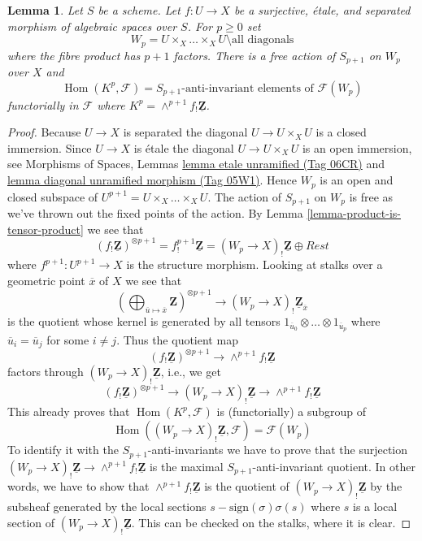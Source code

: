 \documentclass{amsart}
\theoremstyle{plain}
\newtheorem{lemma}[subsection]{Lemma}
\theoremstyle{definition}
\theoremstyle{remark}
\numberwithin{equation}{subsection}
\def\Hom{\mathop{\mathrm{Hom}}\nolimits}
\begin{document}
\begin{lemma}
\label{lemma-compute}
Let $S$ be a scheme. Let $f : U \to X$ be a surjective, \'etale, and separated
morphism of algebraic spaces over $S$. For $p \geq 0$ set
$$
W_p = U \times_X \ldots \times_X U \setminus \text{all diagonals}
$$
where the fibre product has $p + 1$ factors.
There is a free action of $S_{p + 1}$ on $W_p$ over $X$ and
$$
\Hom(K^p, \mathcal{F}) = S_{p + 1}\text{-anti-invariant elements of }
\mathcal{F}(W_p)
$$
functorially in $\mathcal{F}$ where
$K^p = \wedge^{p + 1}f_!\underline{\mathbf{Z}}$.
\end{lemma}

\begin{proof}
Because $U \to X$ is separated the diagonal $U \to U \times_X U$ is a
closed immersion. Since $U \to X$ is \'etale the diagonal
$U \to U \times_X U$ is an open immersion, see
Morphisms of Spaces, Lemmas
\href{https://stacks.math.columbia.edu/tag/06CR}{lemma etale unramified (Tag 06CR)} and
\href{https://stacks.math.columbia.edu/tag/05W1}{lemma diagonal unramified morphism (Tag 05W1)}.
Hence $W_p$ is an open and closed subspace of
$U^{p + 1} = U \times_X \ldots \times_X U$. The action of $S_{p + 1}$
on $W_p$ is free as we've thrown out the fixed points of the action.
By
Lemma \ref{lemma-product-is-tensor-product}
we see that
$$
(f_!\underline{\mathbf{Z}})^{\otimes p + 1} =
f^{p + 1}_!\underline{\mathbf{Z}} = (W_p \to X)_!\underline{\mathbf{Z}}
\oplus Rest
$$
where $f^{p + 1} : U^{p + 1} \to X$ is the structure morphism.
Looking at stalks over a geometric point $\overline{x}$ of $X$
we see that
$$
\left(
\bigoplus\nolimits_{\overline{u} \mapsto \overline{x}} \mathbf{Z}
\right)^{\otimes p + 1}
\longrightarrow
(W_p \to X)_!\underline{\mathbf{Z}}_{\overline{x}}
$$
is the quotient whose kernel is generated by all tensors
$1_{\overline{u}_0} \otimes \ldots \otimes 1_{\overline{u}_p}$
where $\overline{u}_i = \overline{u}_j$ for some $i \not = j$.
Thus the quotient map
$$
(f_!\underline{\mathbf{Z}})^{\otimes p + 1}
\longrightarrow
\wedge^{p + 1}f_!\underline{\mathbf{Z}}
$$
factors through $(W_p \to X)_!\underline{\mathbf{Z}}$, i.e., we get
$$
(f_!\underline{\mathbf{Z}})^{\otimes p + 1}
\longrightarrow
(W_p \to X)_!\underline{\mathbf{Z}}
\longrightarrow
\wedge^{p + 1}f_!\underline{\mathbf{Z}}
$$
This already proves that $\Hom(K^p, \mathcal{F})$ is (functorially) a
subgroup of
$$
\Hom((W_p \to X)_!\underline{\mathbf{Z}}, \mathcal{F}) = \mathcal{F}(W_p)
$$
To identify it with the $S_{p + 1}$-anti-invariants we have to prove that
the surjection $(W_p \to X)_!\underline{\mathbf{Z}}
\to \wedge^{p + 1}f_!\underline{\mathbf{Z}}$ is the maximal
$S_{p + 1}$-anti-invariant quotient. In other words, we have to show that
$\wedge^{p + 1}f_!\underline{\mathbf{Z}}$ is the quotient of
$(W_p \to X)_!\underline{\mathbf{Z}}$ by the subsheaf generated by
the local sections $s - \text{sign}(\sigma)\sigma(s)$ where $s$ is
a local section of $(W_p \to X)_!\underline{\mathbf{Z}}$.
This can be checked on the stalks, where it is clear.
\end{proof}
\end{document}
